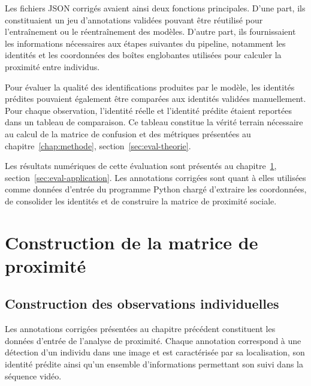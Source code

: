 \documentclass[11pt,a4paper]{report}
\begin{document}
Les fichiers JSON corrigés avaient ainsi deux fonctions principales. D'une
part, ils constituaient un jeu d'annotations validées pouvant être réutilisé
pour l'entraînement ou le réentraînement des modèles. D'autre part, ils
fournissaient les informations nécessaires aux étapes suivantes du pipeline,
notamment les identités et les coordonnées des boîtes englobantes utilisées
pour calculer la proximité entre individus.

Pour évaluer la qualité des identifications produites par le modèle, les
identités prédites pouvaient également être comparées aux identités validées
manuellement. Pour chaque observation, l'identité réelle et l'identité prédite
étaient reportées dans un tableau de comparaison. Ce tableau constitue la
vérité terrain nécessaire au calcul de la matrice de confusion et des métriques
présentées au chapitre~\ref{chap:methode},
section~\ref{sec:eval-theorie}.

Les résultats numériques de cette évaluation sont présentés au
chapitre~\ref{chap:proximite}, section~\ref{sec:eval-application}. Les
annotations corrigées sont quant à elles utilisées comme données d'entrée du
programme Python chargé d'extraire les coordonnées, de consolider les identités
et de construire la matrice de proximité sociale.


\chapter{Construction de la matrice de proximité}
\label{chap:proximite}


\section{Construction des observations individuelles}
\label{sec:construction_observations}

Les annotations corrigées présentées au chapitre précédent constituent les
données d'entrée de l'analyse de proximité. Chaque annotation correspond à une
détection d'un individu dans une image et est caractérisée par sa localisation,
son identité prédite ainsi qu'un ensemble d'informations permettant son suivi
dans la séquence vidéo.
\end{document}
